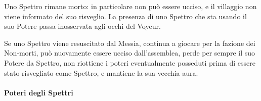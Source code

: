 \documentclass[a4paper,10pt]{article}
\begin{document}
\begin{itemize}
 Uno Spettro rimane morto: in particolare non può essere ucciso, e il villaggio non viene informato del suo risveglio.
 La presenza di uno Spettro che sta usando il suo Potere passa inosservata agli occhi del Voyeur.
 
 Se uno Spettro viene resuscitato dal Messia, continua a giocare per la fazione dei Non-morti, può nuovamente essere ucciso dall'assemblea, perde per sempre il suo Potere da Spettro, non riottiene i poteri eventualmente posseduti prima di essere stato risvegliato come Spettro, e mantiene la sua vecchia aura.
 
\end{itemize}


\paragraph{Poteri degli Spettri}
\end{document}
